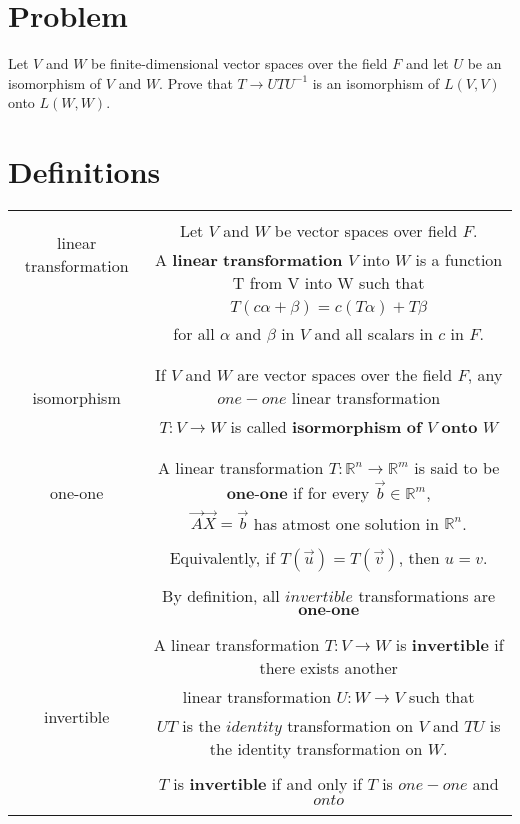 \documentclass[journal,12pt,twocolumn]{IEEEtran}
\newcommand\myemptypage{
    \null
    \thispagestyle{empty}
    \addtocounter{page}{-1}
    \newpage
    }
\begin{document}
\section{Problem}
Let $V$ and $W$ be finite-dimensional vector spaces over the field $F$ and let $U$ be an isomorphism of $V$ and $W$. Prove that $T \rightarrow UTU^{-1}$ is an isomorphism of $L(V,V)$ onto $L(W,W)$.
\section{Definitions}
\begin{table}[h]
	\begin{center}
		\begin{tabular}{|c|c|}
			\hline
			\multirow{3}{*}{linear transformation} & \\
			& Let $V$ and $W$ be vector spaces over field $F$.\\
			& A $\textbf{linear transformation}$ $V$ into $W$ is a function T from V into W such that\\
			& $T(c\alpha + \beta) = c(T\alpha) + T\beta$\\
			& for all $\alpha$ and $\beta$ in $V$ and all scalars in $c$ in $F$.\\
			& \\
			\hline
			\multirow{3}{*}{isomorphism} &\\
			& If $V$ and $W$ are vector spaces over the field $F$, any $one-one$ linear transformation \\
			& $T : V\rightarrow W$ is called $\textbf{isormorphism of}$ $V$ $\textbf{onto}$ $W$\\
			& \\
			\hline			
			\multirow{3}{*}{one-one} & \\
			& A linear transformation $T : \mathbb{R}^{n} \rightarrow \mathbb{R}^{m}$ is said to be $\textbf{one-one}$ if for every  $\vec{b} \in \mathbb{R}^{m}$,\\
			&  $\vec{A}\vec{X} =\vec{b}$ has atmost one solution in $\mathbb{R}^{n}$.\\
			& \\
			& Equivalently, if $T(\vec{u}) = T(\vec{v})$, then $u = v$. \\
			& \\
			& By definition, all $invertible$ transformations are $\textbf{one-one}$\\
			& \\
			\hline
			\multirow{6}{*}{invertible} & \\
			& A linear transformation $T : V \rightarrow W$ is $\textbf{invertible}$ if there exists another\\
			& linear transformation $U: W \rightarrow V$ such that \\
			& $UT$ is the $identity$ transformation on $V$ and $TU$ is the identity transformation on $W$.\\
			& \\
			& $T$ is $\textbf{invertible}$ if and only if $T$ is $one-one$ and $onto$\\
			& \\
			\hline
		\end{tabular}
	\end{center}
\end{table}
\pagebreak
\myemptypage
\end{document}
